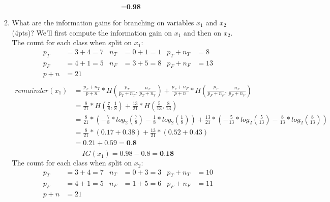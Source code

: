 \documentclass[12pt]{article}
\begin{document}
\begin{enumerate}
\begin{enumerate}
\begin{equation*}
\begin{split}
		& = \textbf{0.98}
\end{split}
\end{equation*}
\newpage
\item What are the information gains for branching on variables $x_1$ and $x_2$ (4pts)?
\hfill\linebreak
\hfill\linebreak
We'll first compute the information gain on $x_1$ and then on $x_2$.\\
The count for each class when split on $x_1$:
\begin{align*}
	p_{T} &= 3 + 4 = 7 & n_{T} &= 0 + 1 = 1 & p_{T} + n_{T} & = 8\\
	p_{F} &= 4 + 1 = 5 & n_{F} &= 3 + 5 = 8 & p_{F} + n_{F} & = 13 \\
	p+n &= 21 & &\\
\end{align*}
\begin{equation*}
\begin{split}
remainder(x_1) & = \frac{p_T + n_T}{p + n} * H(\frac{p_T}{p_T+n_T},\frac{n_T}{p_T+n_T}) + 
			     \frac{p_F+n_F}{p+n}*H(\frac{p_F}{p_F+n_F},\frac{n_F}{p_F+n_F})\\
	& = \frac{8}{21}*H(\frac{7}{8},\frac{1}{8}) + \frac{13}{21}*H(\frac{5}{13},\frac{8}{13})\\
	& = \frac{8}{21}*(-\frac{7}{8}*log_{2}(\frac{7}{8})-\frac{1}{8} * log_{2}(\frac{1}{8})) + 
	       \frac{13}{21}*(-\frac{5}{13}*log_{2}(\frac{5}{13})-\frac{8}{13}*log_{2}(\frac{8}{13}))\\
	& = \frac{8}{21}*(0.17+0.38) + \frac{13}{21}*(0.52+0.43)\\
	& = 0.21 + 0.59 = \textbf{0.8}\\
	\end{split}
\end{equation*}
\begin{equation*}
	IG(x_{1}) = 0.98 - 0.8 = \textbf{0.18}
\end{equation*}
\hfill\linebreak
The count for each class when split on $x_2$:
\begin{align*}
		p_{T} &= 3 + 4 = 7 & n_{T} &= 0 + 3 = 3 & p_{T} + n_{T} & = 10\\
		p_{F} &= 4 + 1 = 5 & n_{F} &= 1 + 5 = 6 & p_{F} + n_{F} & = 11\\
		p+n &= 21 & &\\
\end{align*}
\begin{equation*}
\begin{split}

\end{split}
\end{equation*}
\end{enumerate}
\end{enumerate}
\end{document}
